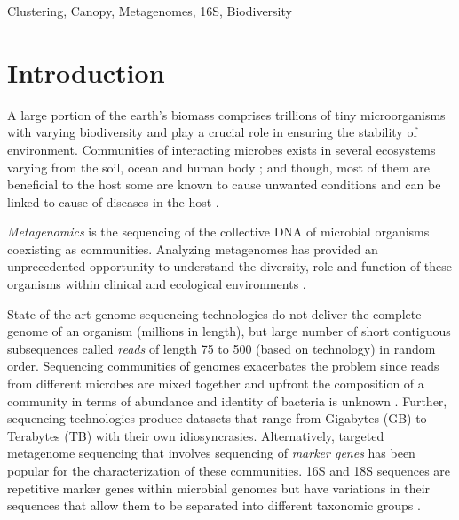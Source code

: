 \documentclass[10pt, conference, compsocconf]{IEEEtran}
\begin{document}
\begin{IEEEkeywords}
Clustering, Canopy, Metagenomes, 16S, Biodiversity 
\end{IEEEkeywords}

%
\IEEEpeerreviewmaketitle

\section{Introduction}
\label{intro}


A large portion of the  earth's biomass comprises trillions of tiny  microorganisms with varying  biodiversity and play a crucial role in ensuring the stability of environment. Communities of interacting microbes  exists in several ecosystems varying from the soil, ocean and human body \cite{MARHumanMicro}; and though, most of them are beneficial to the host some are known to cause unwanted conditions and can be linked to cause of diseases in the host \cite{MARTurnbaugh}. 

\emph{Metagenomics} is the sequencing of the collective DNA  of microbial organisms coexisting as communities. Analyzing metagenomes has provided an unprecedented opportunity to understand the diversity, role and function of these organisms within clinical and ecological environments \cite{MARHumanGut}\cite{MARMihaiPop}.



State-of-the-art genome sequencing technologies do not deliver the complete genome of an organism (millions in length), but large number of short contiguous subsequences called \emph{reads} of length 75 to 500 (based on technology) in random order. Sequencing communities of genomes exacerbates the problem since reads from different microbes are mixed together and upfront  the composition of a community in terms of abundance and identity of bacteria is unknown \cite{MARMetaChallenge}. Further, sequencing technologies produce datasets that range from Gigabytes (GB) to Terabytes (TB) with their own idiosyncrasies.  Alternatively, targeted metagenome sequencing  that involves sequencing of \emph{marker genes} has been popular for the characterization of these communities. 16S and 18S sequences are repetitive marker genes within microbial genomes but have variations in their sequences that allow them to be separated into different taxonomic groups \cite{MAR16S}. 
\end{document}
